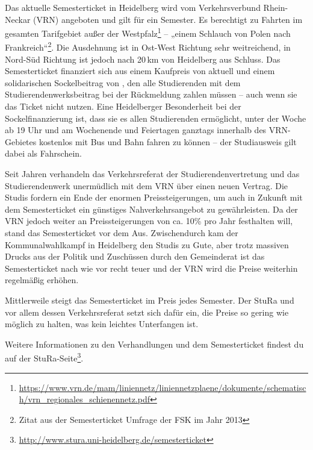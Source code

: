 Das aktuelle Semesterticket in Heidelberg wird vom Verkehrsverbund Rhein-Neckar (VRN) angeboten und gilt für ein Semester. Es berechtigt zu Fahrten im gesamten Tarifgebiet außer der Westpfalz\footnote{\url{https://www.vrn.de/mam/liniennetz/liniennetzplaene/dokumente/schematisch/vrn_regionales_schienennetz.pdf}} -- „einem Schlauch von Polen nach Frankreich“\footnote{Zitat aus der Semesterticket Umfrage der FSK im Jahr 2013}. Die Ausdehnung ist in Ost-West Richtung sehr weitreichend, in Nord-Süd Richtung ist jedoch nach 20\,km von Heidelberg aus Schluss. Das Semesterticket finanziert sich aus einem Kaufpreis von aktuell \EUR{\semesterticket} und einem solidarischen Sockelbeitrag von \EUR{\sockelbeitrag}, den alle Studierenden mit dem Studierendenwerksbeitrag bei der Rückmeldung zahlen müssen -- auch wenn sie das Ticket nicht nutzen. Eine Heidelberger Besonderheit bei der Sockelfinanzierung ist, dass sie es allen Studierenden ermöglicht, unter der Woche ab 19 Uhr und am Wochenende und Feiertagen ganztags innerhalb des VRN-Gebietes kostenlos mit Bus und Bahn fahren zu können -- der Studiausweis gilt dabei als Fahrschein.

Seit Jahren verhandeln das Verkehrsreferat der Studierendenvertretung und das Studierendenwerk unermüdlich mit dem VRN über einen neuen Vertrag. Die Studis fordern ein Ende der enormen Preissteigerungen, um auch in Zukunft mit dem Semesterticket ein günstiges Nahverkehrsangebot zu gewährleisten. Da der VRN jedoch weiter an Preissteigerungen von ca. 10\% pro Jahr festhalten will, stand das Semesterticket vor dem Aus. Zwischendurch kam der Kommunalwahlkampf in Heidelberg den Studis zu Gute, aber trotz massiven Drucks aus der Politik und Zuschüssen durch den Gemeinderat ist das Semesterticket nach wie vor recht teuer und der VRN wird die Preise weiterhin regelmäßig erhöhen.

Mittlerweile steigt das Semesterticket im Preis jedes Semester. Der StuRa und vor allem dessen Verkehrsreferat setzt sich dafür ein, die Preise so gering wie möglich zu halten, was kein leichtes Unterfangen ist.

Weitere Informationen zu den Verhandlungen und dem Semesterticket findest du auf der StuRa-Seite\footnote{\url{http://www.stura.uni-heidelberg.de/semesterticket}}.
